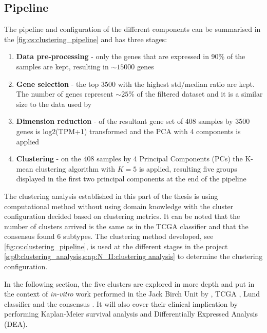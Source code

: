 \subsection{Pipeline}

The pipeline and configuration of the different components can be summarised in the \cref{fig:cs:clustering_pipeline} and has three stages:
\begin{enumerate}
    \item \textbf{Data pre-processing} - only the genes that are expressed in 90\% of the samples are kept, resulting in $\sim15000$ genes
    \item \textbf{Gene selection} - the top $3500$ with the highest std/median ratio are kept. The number of genes represent $\sim25\%$ of the filtered dataset and it is a similar size to the data used by \citet{Robertson2017-mg}
    \item \textbf{Dimension reduction} - of the resultant gene set of 408 samples by 3500 genes is log2(TPM+1) transformed and the PCA with 4 components is applied
    \item \textbf{Clustering} - on the 408 samples by 4 Principal Components (PCs) the K-mean clustering algorithm with $K=5$ is applied, resulting  five groups displayed in the first two principal components at the end of the pipeline
\end{enumerate}

The clustering analysis established in this part of the thesis is using  computational method without using domain knowledge with the cluster configuration decided based on clustering metrics. It can be noted that the number of clusters arrived is the same as in the TCGA classifier \citet{Robertson2017-mg} and that the consensus \citet{Kamoun2020-tj} found 6 subtypes. The clustering method developed, see \cref{fig:cs:clustering_pipeline}, is used at the different stages in the project \cref{s:p0:clustering_analysis,s:ap:N_II:clustering analysis} to determine the clustering configuration.

In the following section, the five clusters are explored in more depth and put in the context of \textit{in-vitro} work performed in the Jack Birch Unit by \citet{Baker2022-bj}, TCGA \citet{Robertson2017-mg}, Lund classifier \citet{Marzouka2018-ge} and the consensus \citet{Kamoun2020-tj}. It will also cover their clinical implication by performing Kaplan-Meier survival analysis and Differentially Expressed Analysis (DEA).

